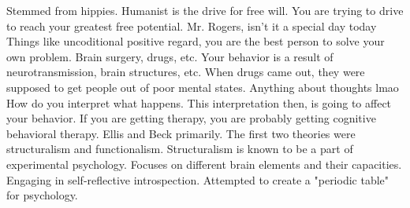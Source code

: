 \markdownRendererUlItem Stemmed from hippies.\markdownRendererUlItemEnd 
\markdownRendererUlItem Humanist is the drive for free will.\markdownRendererUlItemEnd 
\markdownRendererUlItem You are trying to drive to reach your greatest free potential.\markdownRendererUlItemEnd 
\markdownRendererUlEndTight \markdownRendererInterblockSeparator
{}\markdownRendererBlockQuoteBegin
Mr. Rogers, isn't it a special day today
\markdownRendererBlockQuoteEnd \markdownRendererInterblockSeparator
{}\markdownRendererUlBeginTight
\markdownRendererUlItem Things like uncoditional positive regard, you are the best person to solve your own problem.\markdownRendererUlItemEnd 
\markdownRendererUlEndTight \markdownRendererInterblockSeparator
{}\markdownRendererInterblockSeparator
{}\markdownRendererUlBeginTight
\markdownRendererUlItem Brain surgery, drugs, etc.\markdownRendererUlItemEnd 
\markdownRendererUlItem Your behavior is a result of neurotransmission, brain structures, etc.\markdownRendererUlItemEnd 
\markdownRendererUlItem When drugs came out, they were supposed to get people out of poor mental states.\markdownRendererUlItemEnd 
\markdownRendererUlEndTight \markdownRendererInterblockSeparator
{}\markdownRendererInterblockSeparator
{}\markdownRendererUlBeginTight
\markdownRendererUlItem Anything about thoughts lmao\markdownRendererUlItemEnd 
\markdownRendererUlItem How do you interpret what happens.\markdownRendererUlItemEnd 
\markdownRendererUlItem This interpretation then, is going to affect your behavior. If you are getting therapy, you are probably getting cognitive behavioral therapy.\markdownRendererUlItemEnd 
\markdownRendererUlItem Ellis and Beck primarily.\markdownRendererUlItemEnd 
\markdownRendererUlEndTight \markdownRendererInterblockSeparator
{}\markdownRendererInterblockSeparator
{}\markdownRendererUlBeginTight
\markdownRendererUlItem The first two theories were structuralism and functionalism.\markdownRendererUlItemEnd 
\markdownRendererUlItem Structuralism is known to be a part of experimental psychology.\markdownRendererInterblockSeparator
{}\markdownRendererUlBeginTight
\markdownRendererUlItem Focuses on different brain elements and their capacities.\markdownRendererUlItemEnd 
\markdownRendererUlItem Engaging in self-reflective introspection.\markdownRendererUlItemEnd 
\markdownRendererUlItem Attempted to create a "periodic table" for psychology.\markdownRendererUlItemEnd 
\markdownRendererUlEndTight \markdownRendererUlItemEnd 

